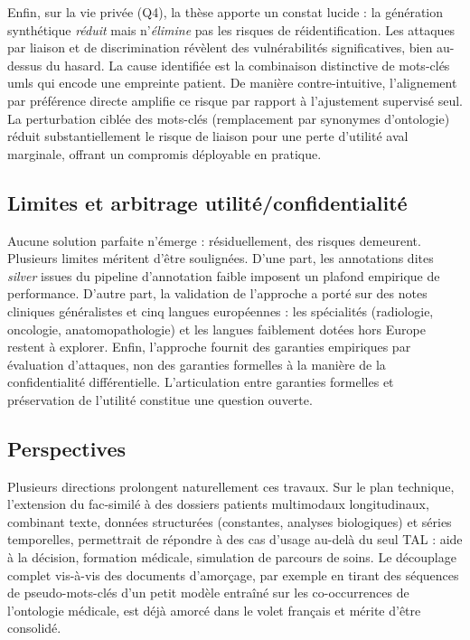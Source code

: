 Enfin, sur la vie privée (Q4), la thèse apporte un constat lucide : la génération synthétique
\textit{réduit} mais n'\textit{élimine} pas les risques de réidentification. Les attaques par
liaison et de discrimination révèlent des vulnérabilités significatives, bien au-dessus du
hasard. La cause identifiée est la combinaison distinctive de mots-clés \gls{umls} qui encode
une empreinte patient. De manière contre-intuitive, l'alignement par préférence directe amplifie
ce risque par rapport à l'ajustement supervisé seul. La perturbation ciblée des mots-clés
(remplacement par synonymes d'ontologie) réduit substantiellement le risque de liaison pour
une perte d'utilité aval marginale, offrant un compromis déployable en pratique.

\subsection{Limites et arbitrage utilité/confidentialité}

Aucune solution parfaite n'émerge : résiduellement, des risques demeurent. Plusieurs limites
méritent d'être soulignées. D'une part, les annotations dites \emph{silver} issues du pipeline
d'annotation faible imposent un plafond empirique de performance. D'autre part, la validation
de l'approche a porté sur des notes cliniques généralistes et cinq langues européennes :
les spécialités (radiologie, oncologie, anatomopathologie) et les langues faiblement dotées
hors Europe restent à explorer. Enfin, l'approche fournit des garanties empiriques par
évaluation d'attaques, non des garanties formelles à la manière de la confidentialité
différentielle. L'articulation entre garanties formelles et préservation de l'utilité constitue
une question ouverte.

\subsection{Perspectives}

Plusieurs directions prolongent naturellement ces travaux. Sur le plan technique, l'extension
du fac-similé à des dossiers patients multimodaux longitudinaux, combinant texte, données
structurées (constantes, analyses biologiques) et séries temporelles, permettrait de répondre
à des cas d'usage au-delà du seul TAL : aide à la décision, formation médicale, simulation de
parcours de soins. Le découplage complet vis-à-vis des documents d'amorçage, par exemple
en tirant des séquences de pseudo-mots-clés d'un petit modèle entraîné sur les co-occurrences
de l'ontologie médicale, est déjà amorcé dans le volet français et mérite d'être consolidé.

